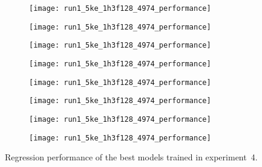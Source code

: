\begin{figure}[h]
	\centering
	\begin{subfigure}[b]{0.25\textwidth}
		\centering
		\texttt{[image: run1\_5ke\_1h3f128\_4974\_performance]}
	\end{subfigure}\hfill%
	\begin{subfigure}[b]{0.25\textwidth}
		\centering
		\texttt{[image: run1\_5ke\_1h3f128\_4974\_performance]}
	\end{subfigure}\hfill%
	\begin{subfigure}[b]{0.25\textwidth}
		\centering
		\texttt{[image: run1\_5ke\_1h3f128\_4974\_performance]}
	\end{subfigure}\hfill%
	\begin{subfigure}[b]{0.25\textwidth}
		\centering
		\texttt{[image: run1\_5ke\_1h3f128\_4974\_performance]}
	\end{subfigure}

	\begin{subfigure}[b]{0.25\textwidth}
		\centering
		\texttt{[image: run1\_5ke\_1h3f128\_4974\_performance]}
	\end{subfigure}\hfill%
	\begin{subfigure}[b]{0.25\textwidth}
		\centering
		\texttt{[image: run1\_5ke\_1h3f128\_4974\_performance]}
	\end{subfigure}\hfill%
	\begin{subfigure}[b]{0.25\textwidth}
		\centering
		\texttt{[image: run1\_5ke\_1h3f128\_4974\_performance]}
	\end{subfigure}\hfill%
	\begin{subfigure}[b]{0.25\textwidth}
		\centering
		\texttt{[image: run1\_5ke\_1h3f128\_4974\_performance]}
	\end{subfigure}
	\caption{Regression performance of the best models trained in experiment~4.}
	\label{fig:reg-performance}
\end{figure}

